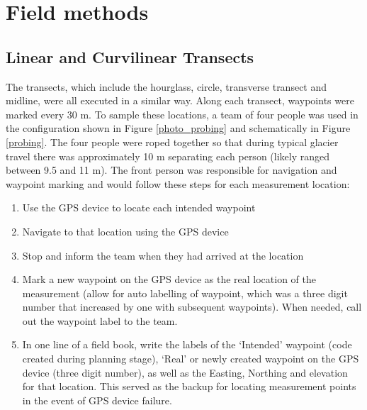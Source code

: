 \documentclass{sfuthesis}
\begin{document}
\section{Field methods}

\subsection{Linear and Curvilinear Transects}
\label{sec:transects}

The transects, which include the hourglass, circle, transverse transect and midline, were all executed in a similar way. Along each transect, waypoints were marked every 30 m. To sample these locations, a team of four people was used in the configuration shown in Figure \ref{photo_probing} and schematically in Figure \ref{probing}. The four people were roped together so that during typical glacier travel there was approximately 10 m separating each person (likely ranged between 9.5 and 11 m). The front person was responsible for navigation and waypoint marking and would follow these steps for each measurement location:
\begin{enumerate}
\item Use the GPS device to locate each intended waypoint
\item Navigate to that location using the GPS device
\item Stop and inform the team when they had arrived at the location
\item Mark a new waypoint on the GPS device as the real location of the measurement (allow for auto labelling of waypoint, which was a three digit number that increased by one with subsequent waypoints). When needed, call out the waypoint label to the team.
\item In one line of a field book, write the labels of the `Intended' waypoint (code created during planning stage), `Real' or newly created waypoint on the GPS device (three digit number), as well as the Easting, Northing and elevation for that location. This served as the backup for locating measurement points in the event of GPS device failure. 
\end{enumerate}
\end{document}
